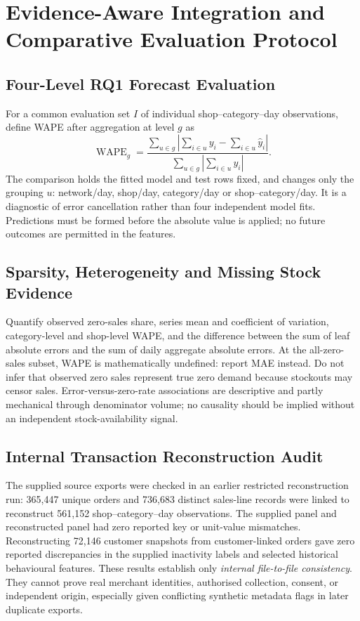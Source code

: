 \section{Evidence-Aware Integration and Comparative Evaluation Protocol}
\subsection{Four-Level RQ1 Forecast Evaluation}
For a common evaluation set \(I\) of individual shop--category--day observations, define WAPE after aggregation at level \(g\) as
\begin{equation}
\operatorname{WAPE}_g=
\frac{\sum_{u\in g}\left|\sum_{i\in u}y_i-\sum_{i\in u}\widehat y_i\right|}
{\sum_{u\in g}\left|\sum_{i\in u}y_i\right|}.
\end{equation}
The comparison holds the fitted model and test rows fixed, and changes only the grouping \(u\): network/day, shop/day, category/day or shop--category/day. It is a diagnostic of error cancellation rather than four independent model fits. Predictions must be formed before the absolute value is applied; no future outcomes are permitted in the features.

\subsection{Sparsity, Heterogeneity and Missing Stock Evidence}
Quantify observed zero-sales share, series mean and coefficient of variation, category-level and shop-level WAPE, and the difference between the sum of leaf absolute errors and the sum of daily aggregate absolute errors. At the all-zero-sales subset, WAPE is mathematically undefined: report MAE instead. Do not infer that observed zero sales represent true zero demand because stockouts may censor sales. Error-versus-zero-rate associations are descriptive and partly mechanical through denominator volume; no causality should be implied without an independent stock-availability signal.

\subsection{Internal Transaction Reconstruction Audit}
The supplied source exports were checked in an earlier restricted reconstruction run: 365,447 unique orders and 736,683 distinct sales-line records were linked to reconstruct 561,152 shop--category--day observations. The supplied panel and reconstructed panel had zero reported key or unit-value mismatches. Reconstructing 72,146 customer snapshots from customer-linked orders gave zero reported discrepancies in the supplied inactivity labels and selected historical behavioural features. These results establish only \emph{internal file-to-file consistency}. They cannot prove real merchant identities, authorised collection, consent, or independent origin, especially given conflicting synthetic metadata flags in later duplicate exports.

